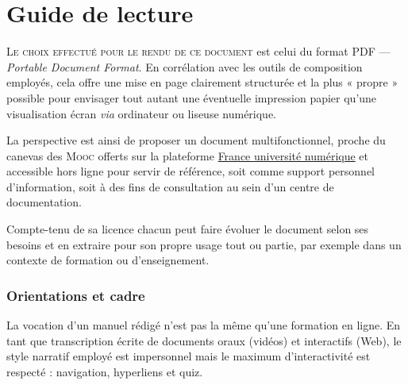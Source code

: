 \chapter*{Guide de lecture}
\label{readingguidebookmark}

\setcounter{sidenote}{0}

\lettrine{L}{e choix effectué pour le rendu de ce document} est celui du format PDF --- \textit{Portable Document Format}. En corrélation avec les outils de composition employés, cela offre une mise en page clairement structurée et la plus « propre » possible pour envisager tout autant une éventuelle impression papier qu'une visualisation écran \textit{via} ordinateur ou liseuse numérique.

La perspective est ainsi de proposer un document multi\-fonctionnel, proche du canevas des \textsc{Mooc} offerts sur la plateforme \href{www.fun-mooc.fr}{France université numérique} et accessible hors ligne pour servir de référence, soit comme support personnel d'information, soit à des fins de consultation au sein d'un centre de documentation. 

Compte-tenu de sa licence chacun peut faire évoluer le document selon ses besoins et en extraire pour son propre usage tout ou partie, par exemple dans un contexte de formation ou d'enseignement.

\subsection*{Orientations et cadre}

La vocation d'un manuel rédigé n'est pas la même qu'une formation en ligne. En tant que transcription écrite de documents oraux (vidéos) et interactifs (Web), le style narratif employé est impersonnel mais le maximum d'interactivité est respecté : navigation, hyperliens et quiz. 

